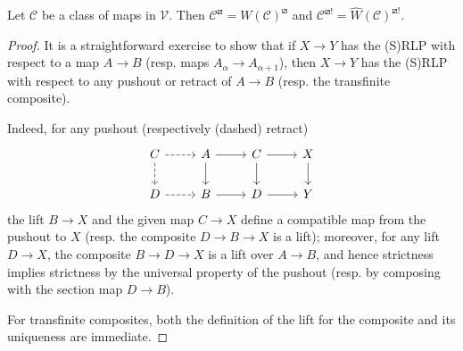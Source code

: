 \documentclass[a4paper,10pt,draft]{article}%
\begin{document}
\begin{lemma}
      \label{HYPER_LP_LEM}
      Let $\mathcal C$ be a class of maps in $\mathcal V$. Then
      $\mathcal C^{\boxslash}= W(\mathcal C)^{\boxslash}$
      and
      $\mathcal C^{\boxslash !} = \hat{W}(\mathcal C)^{\boxslash !}$.
\end{lemma}
\begin{proof}
      It is a straightforward exercise to show that
      if $X \to Y$ has the (S)RLP with respect to a map $A \to B$ (resp. maps $A_\alpha \to A_{\alpha +1}$), then
      $X \to Y$ has the (S)RLP with respect to any pushout or retract of $A \to B$ (resp. the transfinite composite).

      Indeed, for any pushout (respectively (dashed) retract)
      \begin{equation}
            \label{LIFTING_EQ}
            \begin{tikzcd}
                  C \arrow[r, dashed] \arrow[d,dashed]
                  &
                  A \arrow[r] \arrow[d]
                  &
                  C \arrow[r] \arrow[d]
                  &
                  X \arrow[d]
                  \\
                  D \arrow[r, dashed]
                  &
                  B \arrow[r]
                  &
                  D \arrow[r]
                  &
                  Y
            \end{tikzcd}
      \end{equation}
      the lift $B \to X$ and the given map $C \to X$ define a compatible map from the pushout to $X$
      (resp. the composite $D \to B \to X$ is a lift);
      moreover, for any lift $D \to X$, the composite $B \to D \to X$ is a lift over $A \to B$,
      and hence strictness implies strictness by the universal property of the pushout
      (resp. by composing with the section map $D \to B$).

      For transfinite composites,
      both the definition of the lift for the composite and its uniqueness are immediate.


\end{proof}
\end{document}
